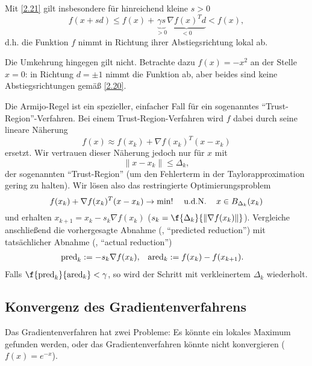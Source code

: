 \begin{nt} \label{2.22}
	Mit \ref{2.21} gilt insbesondere für hinreichend kleine $s > 0$
	\[
		f(x+sd)
		\le f(x) + \underbrace{\gamma s}_{> 0} \underbrace{\nabla f(x)^T d}_{<0}
		< f(x),
	\]
	d.h. die Funktion $f$ nimmt in Richtung ihrer Abstiegsrichtung lokal ab.

	Die Umkehrung hingegen gilt nicht.
	Betrachte dazu $f(x) = -x^2$ an der Stelle $x = 0$: in Richtung $d=\pm 1$ nimmt die Funktion ab, aber beides sind keine Abstiegsrichtungen gemäß \ref{2.20}.
\end{nt}

\begin{nt} \label{2.23}
	Die Armijo-Regel ist ein spezieller, einfacher Fall für ein sogenanntes “Trust-Region”-Verfahren.
	Bei einem Trust-Region-Verfahren wird $f$ dabei durch seine lineare Näherung
	\[
		f(x)
		\approx f(x_k) + \nabla f(x_k)^T (x-x_k)
	\]
	ersetzt.
	Wir vertrauen dieser Näherung jedoch nur für $x$ mit
	\[
		\|x - x_k\| \le \Delta_k,
	\]
	der sogenannten “Trust-Region” (um den Fehlerterm in der Taylorapproximation gering zu halten).
	Wir lösen also das restringierte Optimierungsproblem
	\[
		f(x_k) + \nabla f(x_k)^T (x-x_k) \to \min!
		\quad\;\text{u.d.N.}\,\quad
		x \in B_{\Delta_k}(x_k)
	\]
	und erhalten $x_{k+1} = x_k - s_k \nabla f(x_k)$ ($s_k = \f {\Delta_k}{\|\nabla f(x_k)\|}$).
	Vergleiche anschließend die vorhergesagte Abnahme (\pred, “predicted reduction”) mit tatsächlicher Abnahme (\ared, “actual reduction”)
	\begin{align*}
		\text{pred}_k &:= -s_k \nabla f(x_k), &
		\text{ared}_k &:= f(x_k) - f(x_{k+1}).
	\end{align*}
	Falls $\f {\pred_k}{\ared_k} < \gamma$, so wird der Schritt mit verkleinertem $\Delta_k$ wiederholt.
\end{nt}


\subsection{Konvergenz des Gradientenverfahrens}

Das Gradientenverfahren hat zwei Probleme:
Es könnte ein lokales Maximum gefunden werden, oder das Gradientenverfahren könnte nicht konvergieren ($f(x) = e^{-x}$).

